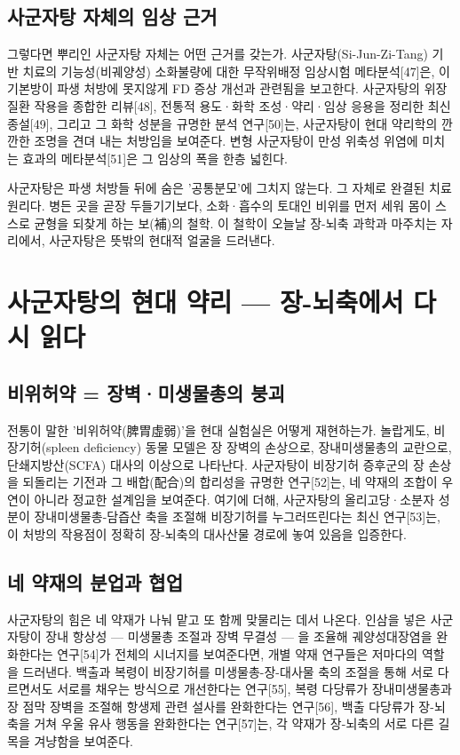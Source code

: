 \documentclass[12pt,oneside]{book}
\begin{document}
\subsection{사군자탕 자체의 임상 근거}

그렇다면 뿌리인 사군자탕 자체는 어떤 근거를 갖는가. 사군자탕(Si-Jun-Zi-Tang) 기반 치료의 기능성(비궤양성) 소화불량에 대한 무작위배정 임상시험 메타분석[47]은, 이 기본방이 파생 처방에 못지않게 FD 증상 개선과 관련됨을 보고한다. 사군자탕의 위장질환 작용을 종합한 리뷰[48], 전통적 용도·화학 조성·약리·임상 응용을 정리한 최신 종설[49], 그리고 그 화학 성분을 규명한 분석 연구[50]는, 사군자탕이 현대 약리학의 깐깐한 조명을 견뎌 내는 처방임을 보여준다. 변형 사군자탕이 만성 위축성 위염에 미치는 효과의 메타분석[51]은 그 임상의 폭을 한층 넓힌다.

사군자탕은 파생 처방들 뒤에 숨은 '공통분모'에 그치지 않는다. 그 자체로 완결된 치료 원리다. 병든 곳을 곧장 두들기기보다, 소화·흡수의 토대인 비위를 먼저 세워 몸이 스스로 균형을 되찾게 하는 보(補)의 철학. 이 철학이 오늘날 장-뇌축 과학과 마주치는 자리에서, 사군자탕은 뜻밖의 현대적 얼굴을 드러낸다.

\section{사군자탕의 현대 약리 — 장-뇌축에서 다시 읽다}

\subsection{비위허약 = 장벽·미생물총의 붕괴}

전통이 말한 '비위허약(脾胃虛弱)'을 현대 실험실은 어떻게 재현하는가. 놀랍게도, 비장기허(spleen deficiency) 동물 모델은 장 장벽의 손상으로, 장내미생물총의 교란으로, 단쇄지방산(SCFA) 대사의 이상으로 나타난다. 사군자탕이 비장기허 증후군의 장 손상을 되돌리는 기전과 그 배합(配合)의 합리성을 규명한 연구[52]는, 네 약재의 조합이 우연이 아니라 정교한 설계임을 보여준다. 여기에 더해, 사군자탕의 올리고당·소분자 성분이 장내미생물총-담즙산 축을 조절해 비장기허를 누그러뜨린다는 최신 연구[53]는, 이 처방의 작용점이 정확히 장-뇌축의 대사산물 경로에 놓여 있음을 입증한다.

\subsection{네 약재의 분업과 협업}

사군자탕의 힘은 네 약재가 나눠 맡고 또 함께 맞물리는 데서 나온다. 인삼을 넣은 사군자탕이 장내 항상성 — 미생물총 조절과 장벽 무결성 — 을 조율해 궤양성대장염을 완화한다는 연구[54]가 전체의 시너지를 보여준다면, 개별 약재 연구들은 저마다의 역할을 드러낸다. 백출과 복령이 비장기허를 미생물총-장-대사물 축의 조절을 통해 서로 다르면서도 서로를 채우는 방식으로 개선한다는 연구[55], 복령 다당류가 장내미생물총과 장 점막 장벽을 조절해 항생제 관련 설사를 완화한다는 연구[56], 백출 다당류가 장-뇌축을 거쳐 우울 유사 행동을 완화한다는 연구[57]는, 각 약재가 장-뇌축의 서로 다른 길목을 겨냥함을 보여준다.
\end{document}
